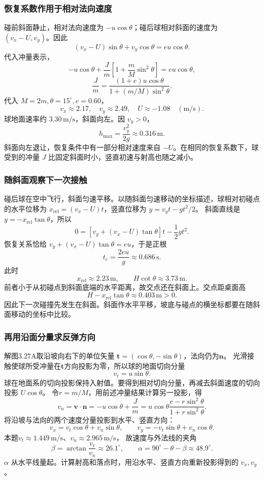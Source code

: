 \documentclass[UTF8,fontset=fandol,a4paper,11pt]{ctexart}
\newcommand{\vect}[1]{\bm{#1}}
\begin{document}
\subsubsection*{恢复系数作用于相对法向速度}
碰前斜面静止，相对法向速度为 $-u\cos\theta$；碰后球相对斜面的速度为 $(v_x-U,v_y)$。因此
\[
(v_x-U)\sin\theta+v_y\cos\theta=eu\cos\theta.
\]
代入冲量表示，
\[
-u\cos\theta+\frac{J}{m}
\left[1+\frac mM\sin^2\theta\right]=eu\cos\theta,
\]
\[
\boxed{\frac{J}{m}
=\frac{(1+e)u\cos\theta}{1+(m/M)\sin^2\theta}}.
\]
代入 $M=2m,\theta=15^\circ,e=0.60$，
\[
\boxed{v_x\approx2.17,\quad v_y\approx2.49,\quad
U\approx-1.08\quad(\mathrm{m/s})}.
\]
球地面速率约 $3.30\,\mathrm{m/s}$，斜面向左。因 $v_y>0$，
\[
\boxed{h_{\max}=\frac{v_y^2}{2g}\approx0.316\,\mathrm m}.
\]
斜面向左退让，恢复条件中有一部分相对速度来自 $-U$。在相同的恢复系数下，球受到的冲量 $J$ 比固定斜面时小，竖直初速与射高也随之减小。

\subsubsection*{随斜面观察下一次接触}
碰后球在空中飞行，斜面匀速平移。以随斜面匀速移动的坐标描述，球相对初碰点的水平位移为
$x_{\mathrm{rel}}=(v_x-U)t$，竖直位移为 $y=v_yt-gt^2/2$。
斜面直线是 $y=-x_{\mathrm{rel}}\tan\theta$，所以
\[
0=[v_y+(v_x-U)\tan\theta]t-\frac12gt^2.
\]
恢复关系恰给 $v_y+(v_x-U)\tan\theta=eu$，于是正根
\[
t_c=\frac{2eu}{g}\approx0.686\,\mathrm s.
\]
此时
\[
x_{\mathrm{rel}}\approx2.23\,\mathrm m,\qquad
H\cot\theta\approx3.73\,\mathrm m.
\]
前者小于从初碰点到斜面底端的水平距离，故交点还在斜面上。交点距桌面高
\[
H-x_{\mathrm{rel}}\tan\theta\approx0.403\,\mathrm m>0.
\]
因此下一次碰撞先发生在斜面。斜面作水平平移，坡底与碰点的横坐标都要在随斜面移动的坐标中比较。
\subsubsection*{再用沿面分量求反弹方向}
解图3.27A取沿坡向右下的单位矢量
$\vect t=(\cos\theta,-\sin\theta)$，法向仍为$\vect n$。
光滑接触使球所受冲量在$\vect t$方向投影为零，所以球的地面切向分量
\[
v_t=u\sin\theta.
\]
球在地面系的切向投影保持入射值。要得到相对切向分量，再减去斜面速度的切向投影 $U\cos\theta$。
令$r=m/M$，用前述冲量结果计算另一投影，得
\[
v_n=\vect v\cdot\vect n=-u\cos\theta+\frac Jm
=u\cos\theta\frac{e-r\sin^2\theta}{1+r\sin^2\theta}.
\]
将沿坡与法向的两个速度分量投影到水平、竖直方向：
\[
v_x=v_t\cos\theta+v_n\sin\theta,\qquad
v_y=-v_t\sin\theta+v_n\cos\theta.
\]
本题$v_t\approx1.449\,\mathrm{m/s}$、$v_n\approx2.965\,\mathrm{m/s}$，
故速度与外法线的夹角
\[
\beta=\arctan\frac{v_t}{v_n}\approx26.1^\circ,
\qquad \alpha=90^\circ-\theta-\beta\approx48.9^\circ.
\]
$\alpha$ 从水平线量起。计算射高和落点时，用沿水平、竖直方向重新投影得到的 $v_x,v_y$。
\end{document}
